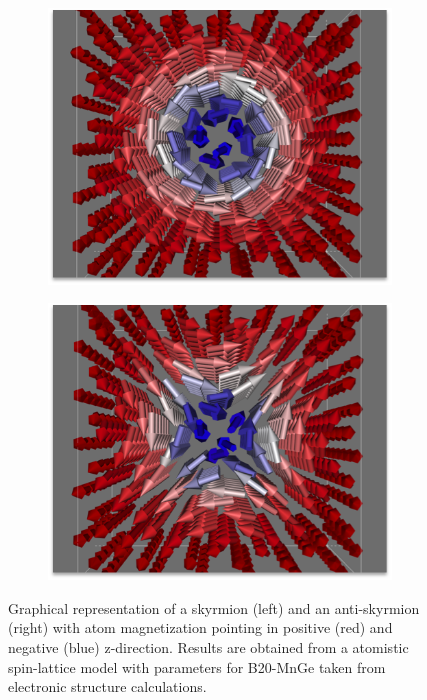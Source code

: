 \documentclass [a4paper, 12pt]{article}
\begin{document}
\begin{figure}[h]
	\centering
	\begin{subfigure}{.5\textwidth}
		  \centering
		  \includegraphics[width=.99\linewidth]{Figures/MnGe_skyrmion.png}
		  \label{fig:sub1}
	\end{subfigure}%
	\begin{subfigure}{.5\textwidth}
		  \centering
		  \includegraphics[width=.99\linewidth]{Figures/MnGe_antiskyrmion.png}
                  \label{fig:sub2}
	\end{subfigure}
	\caption{Graphical representation of a skyrmion (left) and an anti-skyrmion (right) 
	with atom magnetization pointing in positive (red) and negative (blue) z-direction. Results
	are obtained from a atomistic spin-lattice model with parameters for B20-MnGe
	taken from electronic structure calculations.}
	\label{fig:sd_results}
\end{figure}
\end{document}
